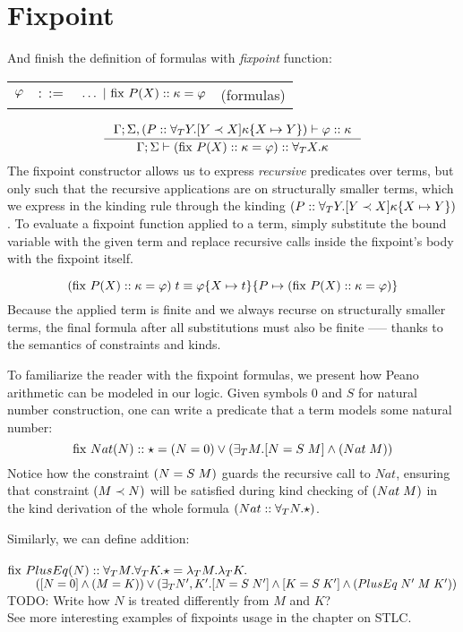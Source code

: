 \documentclass[english, mgr]{iithesis}
\begin{document}
\section{Fixpoint}
\newcommand{\fix}[3]{\ensuremath{\text{fix }#1(#2)\ofkind#3=}}
And finish the definition of formulas with \textit{fixpoint} function:

\begin{tabular}{rrlr}
$\varphi$ & $::=$ & $\ldots
               \bnfor \fix{\propv}{\termv}{\kind}{\formphi} $
    & (formulas)
\end{tabular}
$$
\inference{
  \cEnv;\kEnv, (\propv \ofkind \kForallTerm{Y} \kGuard{Y \cshlt \termv}{\kind\subst{\termv}{Y}})\vdash \formphi \ofkind \kind
}{
  \cEnv;\kEnv\vdash (\fix{\propv}{\termv}{\kind}{\formphi}) \ofkind \kForallTerm{\termv}{\kind}
}
$$
The fixpoint constructor allows us to express \textit{recursive} predicates over terms,
but only such that the recursive applications are on structurally smaller terms,
which we express in the kinding rule through the kinding $(P :: \forall_T Y . [Y \prec X]{\kappa\{X\mapsto Y\}})$.
To evaluate a fixpoint function applied to a term, simply substitute the bound
variable with the given term and replace recursive calls inside the fixpoint's body with the fixpoint itself.

$$
(\fix{\propv}{\termv}{\kind}{\formphi})\fApp\term
\equiv
\formphi\subst{\termv}{\term}\subst{\propv}{(\fix{\propv}{\termv}{\kind}{\formphi})}
$$
Because the applied term is finite
and we always recurse on structurally smaller terms,
the final formula after all substitutions must also be finite
--— thanks to the semantics of constraints and kinds.

To familiarize the reader with the fixpoint formulas,
we present how Peano arithmetic can be modeled in our logic.
Given symbols $0$ and $S$ for natural number construction,
one can write a predicate that a term models some natural number:
$$
\fix{Nat}{N}{\kProp}{(N \ceq 0) \vee (\fExistsTerm{M} \fCAnd{N \ceq {S \tapp M}} ({Nat}\fAppTerm{M}))}
$$
Notice how the constraint $(N = {S \; M})$ guards the recursive call to $Nat$,
ensuring that constraint $(M \prec N)$ will be satisfied during kind checking of
$({{Nat}\;M})$ in the kind derivation of the whole formula
$({Nat} :: \forall_T N .{\star})$.

Similarly, we can define addition: \\ \\
$\fix{PlusEq}{N}{\kForallTerm{M}\kForallTerm{K}\kProp}{\fLamTerm{M}\fLamTerm{K}}$ \\
$\text{ }\qquad
  ([N = 0]\wedge{(M =K)}) \vee
   (\exists_T N', K' .[N = {S \; N'}]\wedge[K = {S \; K'}]\wedge{({PlusEq}\;{N'}\;{M}\;{K'})}
   )
$
\\
TODO: Write how $N$ is treated differently from $M$ and $K$?
\\
See more interesting examples of fixpoints usage in the chapter on STLC.
\end{document}
